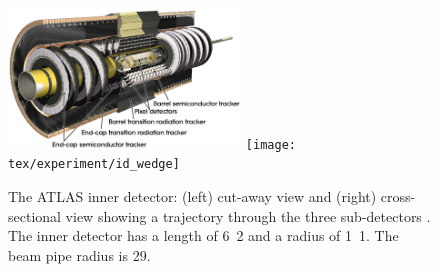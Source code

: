\begin{figure}
	\includegraphics[width=0.55\textwidth]{tex/experiment/id_whole}
	\hfill
	\texttt{[image: tex/experiment/id\_wedge]}
	\caption{The ATLAS inner detector: (left) cut-away view and (right) cross-sectional 
	view showing a trajectory through the three sub-detectors \cite{ATLAS-detector}. The 
	inner detector has a length of \unit{6.2}{\metre} and a radius of \unit{1.1}{\metre}. 
	The beam pipe radius is \unit{29}{\milli\metre}.}
	\label{fig:inner_detector}
\end{figure}

